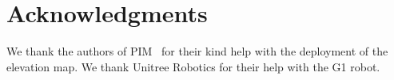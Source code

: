 \section*{Acknowledgments}

We thank the authors of PIM~\cite{long2024learninghumanoid} for their kind help with the deployment of the elevation map. We thank Unitree Robotics for their help with the G1 robot.